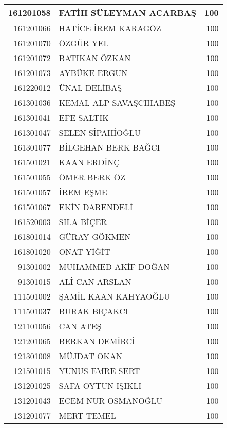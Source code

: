\documentclass[12pt]{article}
\begin{document}
\begin{longtable}{||r||l||r||}
    \midrule
    161201058 & FATİH SÜLEYMAN ACARBAŞ & 100 \\
    \midrule
    161201066 & HATİCE İREM KARAGÖZ & 100 \\
    \midrule
    161201070 & ÖZGÜR YEL & 100 \\
    \midrule
    161201072 & BATIKAN ÖZKAN & 100 \\
    \midrule
    161201073 & AYBÜKE ERGUN & 100 \\
    \midrule
    161220012 & ÜNAL DELİBAŞ & 100 \\
    \midrule
    161301036 & KEMAL ALP SAVAŞCIHABEŞ & 100 \\
    \midrule
    161301041 & EFE SALTIK & 100 \\
    \midrule
    161301047 & SELEN SİPAHİOĞLU & 100 \\
    \midrule
    161301077 & BİLGEHAN BERK BAĞCI & 100 \\
    \midrule
    161501021 & KAAN ERDİNÇ & 100 \\
    \midrule
    161501055 & ÖMER BERK ÖZ & 100 \\
    \midrule
    161501057 & İREM EŞME & 100 \\
    \midrule
    161501067 & EKİN DARENDELİ & 100 \\
    \midrule
    161520003 & SILA BİÇER & 100 \\
    \midrule
    161801014 & GÜRAY GÖKMEN & 100 \\
    \midrule
    161801020 & ONAT YİĞİT & 100 \\
    \midrule
    91301002 & MUHAMMED AKİF DOĞAN & 100 \\
    \midrule
    91301015 & ALİ CAN ARSLAN & 100 \\
    \midrule
    111501002 & ŞAMİL KAAN KAHYAOĞLU & 100 \\
    \midrule
    111501037 & BURAK BIÇAKCI & 100 \\
    \midrule
    121101056 & CAN ATEŞ & 100 \\
    \midrule
    121201065 & BERKAN DEMİRCİ & 100 \\
    \midrule
    121301008 & MÜJDAT OKAN & 100 \\
    \midrule
    121501015 & YUNUS EMRE SERT & 100 \\
    \midrule
    131201025 & SAFA OYTUN IŞIKLI & 100 \\
    \midrule
    131201043 & ECEM NUR OSMANOĞLU & 100 \\
    \midrule
    131201077 & MERT TEMEL & 100 \\

\end{longtable}
\end{document}
